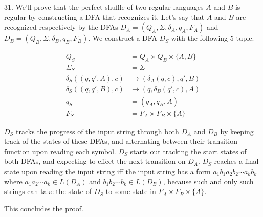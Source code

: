 \documentclass{article}
\begin{document}
31. We'll prove that the perfect shuffle of two regular languages $A$ and $B$ is regular by constructing a DFA that recognizes it. Let's say that $A$ and $B$ are recognized respectively by the DFAs $D_A = (Q_A, \Sigma, \delta_A, q_A, F_A)$ and $D_B = (Q_B, \Sigma, \delta_B, q_B, F_B)$. We construct a DFA $D_S$ with the following 5-tuple.

\begin{align*}
    Q_S                     &= Q_A \times Q_B \times \{A, B\} \\
    \Sigma_S                &= \Sigma \\
    \delta_S((q, q', A), c) &\rightarrow (\delta_A(q, c), q', B) \\
    \delta_S((q, q', B), c) &\rightarrow (q, \delta_B(q', c), A) \\
    q_S                     &= (q_A, q_B, A) \\
    F_S                     &= F_A \times F_B \times \{A\}
\end{align*}

$D_S$ tracks the progress of the input string through both $D_A$ and $D_B$ by keeping track of the states of these DFAs, and alternating between their transition function upon reading each symbol. $D_S$ starts out tracking the start states of both DFAs, and expecting to effect the next transition on $D_A$. $D_S$ reaches a final state upon reading the input string iff the input string has a form $a_1 b_1 a_2 b_2 \cdots a_k b_k$ where $a_1 a_2 \cdots a_k \in L(D_A)$ and $b_1 b_2 \cdots b_k \in L(D_B)$, because such and only such strings can take the state of $D_S$ to some state in $F_A \times F_B \times \{A\}$. 

This concludes the proof.
\end{document}
